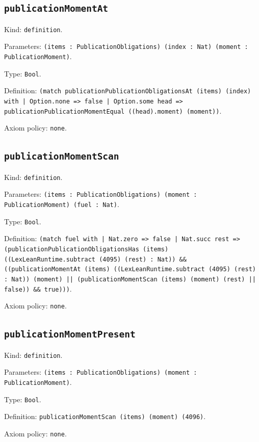 \documentclass[11pt]{article}
\begin{document}
\subsection*{\texttt{publicationMomentAt}}
\noindent Kind: \texttt{definition}.\par
\noindent Parameters: \texttt{(items : PublicationObligations) (index : Nat) (moment : PublicationMoment)}.\par
\noindent Type: \texttt{Bool}.\par
\noindent Definition: \texttt{(match publicationPublicationObligationsAt (items) (index) with | Option.none => false | Option.some head => publicationPublicationMomentEqual ((head).moment) (moment))}.\par
\noindent Axiom policy: \texttt{none}.\par
\subsection*{\texttt{publicationMomentScan}}
\noindent Kind: \texttt{definition}.\par
\noindent Parameters: \texttt{(items : PublicationObligations) (moment : PublicationMoment) (fuel : Nat)}.\par
\noindent Type: \texttt{Bool}.\par
\noindent Definition: \texttt{(match fuel with | Nat.zero => false | Nat.succ rest => (publicationPublicationObligationsHas (items) ((LexLeanRuntime.subtract (4095) (rest) : Nat)) \&\& ((publicationMomentAt (items) ((LexLeanRuntime.subtract (4095) (rest) : Nat)) (moment) || (publicationMomentScan (items) (moment) (rest) || false)) \&\& true)))}.\par
\noindent Axiom policy: \texttt{none}.\par
\subsection*{\texttt{publicationMomentPresent}}
\noindent Kind: \texttt{definition}.\par
\noindent Parameters: \texttt{(items : PublicationObligations) (moment : PublicationMoment)}.\par
\noindent Type: \texttt{Bool}.\par
\noindent Definition: \texttt{publicationMomentScan (items) (moment) (4096)}.\par
\noindent Axiom policy: \texttt{none}.\par
\end{document}
